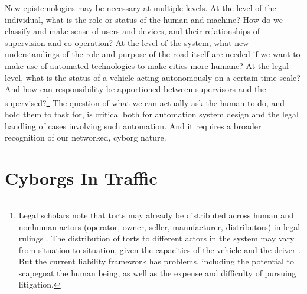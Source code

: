 New epistemologies may be
necessary at multiple levels. At the level of the individual, what is
the role or status of the human and machine? How do we
classify and make sense of users and devices, and their
relationships of supervision and co-operation? At the level of the
system, what new understandings of the role and purpose of the road
itself are needed if we want to make use of automated technologies to
make cities more humane? At the legal level, what is the status of a
vehicle acting autonomously on a certain time scale? And how can
responsibility be apportioned between supervisors and the
supervised?\footnote{Legal scholars note that
torts may already be distributed across human and nonhuman actors
(operator, owner, seller, manufacturer, distributors) in legal
rulings \cite{proximityLiability}. The distribution of
torts to different actors in the system may vary from situation to
situation, given the capacities of 
the vehicle and the driver \cite[p. 267]{suemycar}. But
the current liability framework has problems, including the
potential to scapegoat the human being, as well as the expense and difficulty
of pursuing litigation.}
The question of what we can actually ask the human to do, and hold them to task
for, is critical both for automation system design and the
legal handling of cases involving such automation. And it requires a
broader recognition of our networked, 
cyborg nature.


\section{Cyborgs In Traffic}


